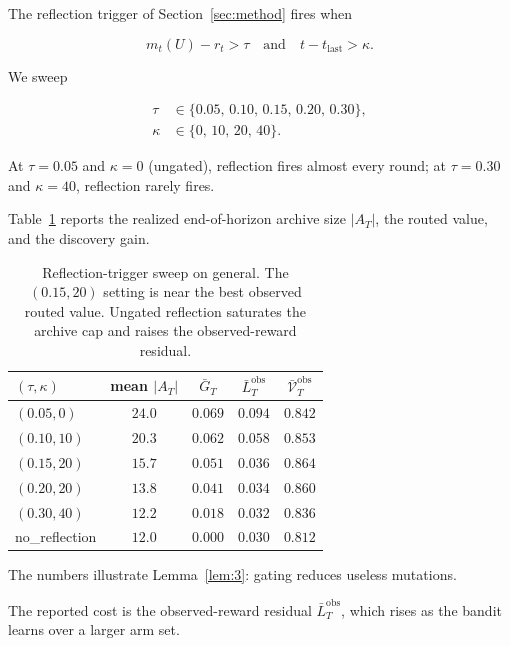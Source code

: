 \documentclass{article} %
\begin{document}
\label{app:reflection-sweep}

The reflection trigger of Section~\ref{sec:method} fires when

\begin{equation}
\label{eq:app-trigger-recap}
m_t(U)-r_t > \tau \quad\text{and}\quad t-t_{\text{last}}>\kappa.
\end{equation}

We sweep

\begin{align}
\label{eq:app-tau-grid}
\tau &\in \{0.05,\,0.10,\,0.15,\,0.20,\,0.30\},\\
\label{eq:app-kappa-grid}
\kappa &\in \{0,\,10,\,20,\,40\}.
\end{align}

At $\tau=0.05$ and $\kappa=0$ (ungated), reflection fires almost every round; at $\tau=0.30$ and $\kappa=40$, reflection rarely fires.

Table~\ref{tab:app-reflection-sweep} reports the realized end-of-horizon archive size $|A_T|$, the routed value, and the discovery gain.

\begin{table}[h]
\centering
\small
\begin{tabular}{lcccc}
\toprule
$(\tau,\kappa)$ & mean $|A_T|$ & $\bar G_T$ & $\bar L_T^{\mathrm{obs}}$ & $\bar{\mathcal V}_T^{\mathrm{obs}}$ \\
\midrule
$(0.05,0)$    & $24.0$ & $0.069$ & $0.094$ & $0.842$ \\
$(0.10,10)$   & $20.3$ & $0.062$ & $0.058$ & $0.853$ \\
$(0.15,20)$   & $15.7$ & $0.051$ & $0.036$ & $0.864$ \\
$(0.20,20)$   & $13.8$ & $0.041$ & $0.034$ & $0.860$ \\
$(0.30,40)$   & $12.2$ & $0.018$ & $0.032$ & $0.836$ \\
no\_reflection& $12.0$ & $0.000$ & $0.030$ & $0.812$ \\
\bottomrule
\end{tabular}
\caption{Reflection-trigger sweep on general. The \((0.15,20)\) setting is
near the best observed routed value. Ungated reflection saturates the archive
cap and raises the observed-reward residual.}
\label{tab:app-reflection-sweep}
\end{table}

The numbers illustrate Lemma~\ref{lem:3}: gating reduces useless mutations.

The reported cost is the observed-reward residual
\(\bar L_T^{\mathrm{obs}}\), which rises as the bandit learns over a larger arm
set.
\end{document}
